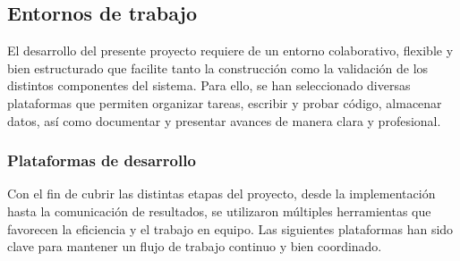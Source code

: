 \subsection{Entornos de trabajo}

El desarrollo del presente proyecto requiere de un entorno colaborativo, flexible y bien estructurado que facilite tanto la construcción como la validación de los distintos componentes del sistema. Para ello, se han seleccionado diversas plataformas que permiten organizar tareas, escribir y probar código, almacenar datos, así como documentar y presentar avances de manera clara y profesional.

\subsubsection{Plataformas de desarrollo}

Con el fin de cubrir las distintas etapas del proyecto, desde la implementación hasta la comunicación de resultados, se utilizaron múltiples herramientas que favorecen la eficiencia y el trabajo en equipo. Las siguientes plataformas han sido clave para mantener un flujo de trabajo continuo y bien coordinado.

